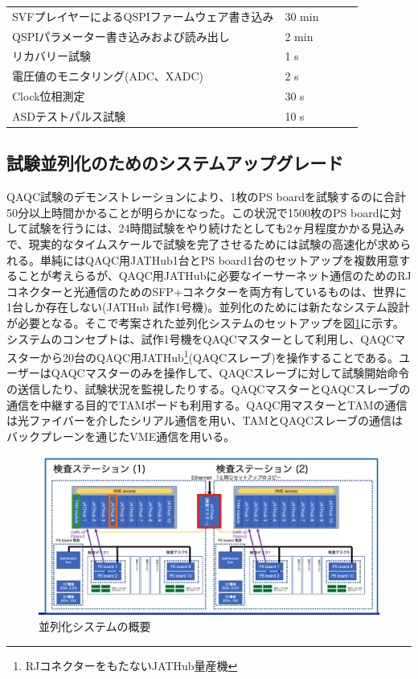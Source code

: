 \begin{table}[]
    \begin{tabular}{lllll}
    SVFプレイヤーによるQSPIファームウェア書き込み    & 30 min &  &  &  \\
    QSPIパラメーター書き込みおよび読み出し         & 2 min  &  &  &  \\
    リカバリー試験                       & 1 s    &  &  &  \\
    電圧値のモニタリング(ADC、XADC) & 2 s    &  &  &  \\
    Clock位相測定                     & 30 s   &  &  &  \\
    ASDテストパルス試験                   & 10 s   &  &  & 
    \end{tabular}
    \label{table_testtime}
\end{table}

\subsection{試験並列化のためのシステムアップグレード}
\label{subsec_parallel}
QAQC試験のデモンストレーションにより、1枚のPS boardを試験するのに合計50分以上時間かかることが明らかになった。この状況で1500枚のPS boardに対して試験を行うには、24時間試験をやり続けたとしても2ヶ月程度かかる見込みで、現実的なタイムスケールで試験を完了させるためには試験の高速化が求められる。単純にはQAQC用JATHub1台とPS board1台のセットアップを複数用意することが考えらるが、QAQC用JATHubに必要なイーサーネット通信のためのRJコネクターと光通信のためのSFP+コネクターを両方有しているものは、世界に1台しか存在しない(JATHub 試作1号機)。並列化のためには新たなシステム設計が必要となる。そこで考案された並列化システムのセットアップを図\ref{QAQCpararell}に示す。システムのコンセプトは、試作1号機をQAQCマスターとして利用し、QAQCマスターから20台のQAQC用JATHub\footnote{RJコネクターをもたないJATHub量産機}(QAQCスレーブ)を操作することである。ユーザーはQAQCマスターのみを操作して、QAQCスレーブに対して試験開始命令の送信したり、試験状況を監視したりする。QAQCマスターとQAQCスレーブの通信を中継する目的でTAMボードも利用する。QAQC用マスターとTAMの通信は光ファイバーを介したシリアル通信を用い、TAMとQAQCスレーブの通信はバックプレーンを通じたVME通信を用いる。
\begin{figure} 
    \centering
    \includegraphics[width=16cm]{fig/QAQC/QAQCpararell.png}
    \caption[並列化システムの概要]{並列化システムの概要}
    \label{QAQCpararell}
\end{figure}

